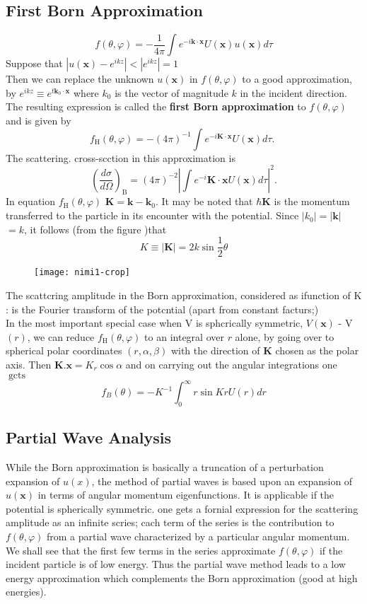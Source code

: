 \subsection{First Born Approximation}
$$f(\theta, \varphi)=-\frac{1}{4 \pi} \int e^{-i \mathbf{k} \cdot \mathbf{x}} U(\mathbf{x}) u(\mathbf{x}) d \tau$$
Suppose that $\left|u(\mathbf{x})-e^{i k z}\right|<\left|e^{i k z}\right|=1$\\
Then we can replace the unknown $u(\mathbf{x})$ in $f(\theta, \varphi)$ to a good approximation, by $e^{i k z} \equiv e^{t \mathbf{k}_{0} \cdot \mathbf{x}}$ where $k_{0}$ is the vector of magnitude $k$ in the incident direction. The resulting expression is called the \textbf{first Born approximation} to $f(\theta, \varphi)$ and is given by
$$
f_{\mathrm{H}}(\theta, \varphi)=-(4 \pi)^{-1} \int e^{-i \mathbf{K} \cdot \mathbf{x}} U(\mathbf{x}) d \tau \text {. }
$$
The scattering. cross-scction in this approximation is
$$
\left(\frac{d \sigma}{d \Omega}\right)_{\mathrm{B}}=(4 \pi)^{-2}\left|\int e^{-i} \mathbf{K} \cdot \mathbf{x} U(\mathbf{x}) d \tau\right|^{2} .
$$
In equation $f_{\mathrm{H}}(\theta, \varphi)$  $\mathbf{K}=\mathbf{k}- \mathbf{k}_{0}$. It may be noted that $\hbar \mathbf{K}$ is the momentum transferred to the particle in its encounter with the potential. Since $\left|k_{0}\right|=|\mathbf{k}|$ $=k$, it follows (from the figure )that
$$K \equiv|\mathbf{K}|=2 k \sin \frac{1}{2} \theta$$
\begin{figure}[H]
	\centering
	\texttt{[image: nimi1-crop]}
	\caption{}
	\label{}
\end{figure}
The scattcring amplitude in the Born approximation, considered as ifunction of $\mathrm{K}$ : is the Fourier transform of the potcntial (apart from constant facturs;)\\
In the most important special case when V is sphcrically symmetric, $V(\mathbf{x})$ - V $(r)$, we can reduce $
f_{\mathrm{H}}(\theta, \varphi)$ to an integral over $r$ alone, by going over to spherical polar coordinates $(r, \alpha, \beta)$ with the direction of $\mathbf{K}$ chosen as the polar axis. Then $\mathbf{K} . \mathbf{x}=K_{r} \cos \alpha$ and on carrying out the angular integrations one $\operatorname{gcts}$
$$
f_{B}(\theta)=-K^{-1} \int_{0}^{\infty} r \sin K r U(r) d r
$$
\subsection{Partial Wave Analysis}
While the Born approximation is basically a truncation of a perturbation expansion of $u(x)$, the method of partial waves is based upon an expansion of $u(\mathbf{x})$ in terms of angular momentum eigenfunctions. It is applicable if the potential is spherically symmetric. one gets a fornial expression for the scattering amplitude as an infinite scries; cach term of the series is the contribution to $f(\theta, \varphi)$ from a partial wave characterized by a particular angular momentum. We shall see that the first few terms in the series approximate $f(\theta, \varphi)$ if the incident particle is of low energy. Thus the partial wave method leads to a low energy approximation which complements the Born approximation (good at high energies).
